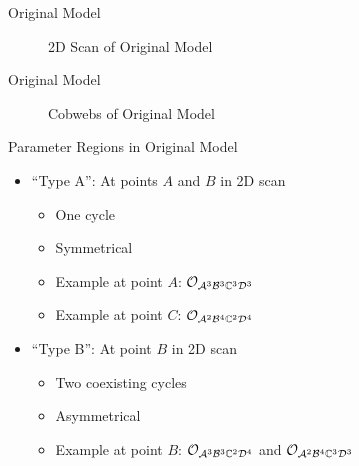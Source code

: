 \begin{frame}{Original Model}
	\vspace{-2.0em}
	\begin{figure}
		\centering
		\caption{2D Scan of Original Model}
	\end{figure}
\end{frame}

\begin{frame}{Original Model}
	\vspace{-3.0em}
	\begin{figure}
		\centering
		\caption{Cobwebs of Original Model}
	\end{figure}
\end{frame}

\begin{frame}{Parameter Regions in Original Model}
	\begin{itemize}
		\item ``Type A'': At points $A$ and $B$ in 2D scan
		      \begin{itemize}
			      \item One cycle
			      \item Symmetrical
			      \item Example at point $A$: $\mathcal{O}_{\mathcal{A}^3\mathcal{B}^3\mathbb{C}^3\mathcal{D}^3}$
			      \item Example at point $C$: $\mathcal{O}_{\mathcal{A}^2\mathcal{B}^4\mathbb{C}^2\mathcal{D}^4}$ \vspace*{1em}
		      \end{itemize}
		\item ``Type B'': At point $B$ in 2D scan
		      \begin{itemize}
			      \item Two coexisting cycles
			      \item Asymmetrical
			      \item Example at point $B$: $\mathcal{O}_{\mathcal{A}^3\mathcal{B}^3\mathbb{C}^2\mathcal{D}^4}$ and $\mathcal{O}_{\mathcal{A}^2\mathcal{B}^4\mathbb{C}^3\mathcal{D}^3}$
		      \end{itemize}
	\end{itemize}
\end{frame}

